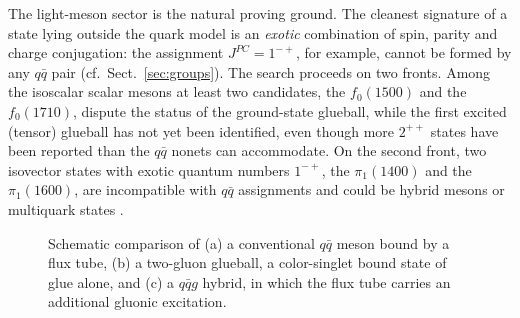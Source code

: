 The light-meson sector is the natural proving ground. The cleanest signature of a
state lying outside the quark model is an \emph{exotic} combination of spin, parity
and charge conjugation: the assignment $J^{PC}=1^{-+}$, for example, cannot be
formed by any $q\bar q$ pair (cf.\ Sect.~\ref{sec:groups}). The search proceeds on
two fronts. Among the isoscalar scalar mesons at least two candidates, the
$f_0(1500)$ and the $f_0(1710)$, dispute the status of the ground-state glueball,
while the first excited (tensor) glueball has not yet been identified, even though
more $2^{++}$ states have been reported than the $q\bar q$ nonets can accommodate.
On the second front, two isovector states with exotic quantum numbers $1^{-+}$, the
$\pi_1(1400)$ and the $\pi_1(1600)$, are incompatible with $q\bar q$ assignments and
could be hybrid mesons or multiquark states \cite[Ch.~11]{Amsler2018}.

\begin{figure}[htbp]
  \centering
  \caption{Schematic comparison of (a) a conventional $q\bar q$ meson bound by
  a flux tube, (b) a two-gluon glueball, a color-singlet bound state of
  glue alone, and (c) a $q\bar q g$ hybrid, in which the flux tube carries an
  additional gluonic excitation.}
  \label{fig:glueball_hybrid_cartoon}
\end{figure}


